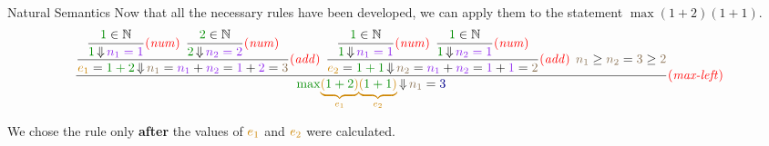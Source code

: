 \begin{example}[Lecture 3]{Natural Semantics}
  Now that all the necessary rules have been developed, we can apply them to the statement $\max (1+2) (1+1)$.
  \begin{equation*}
    \dfrac{
      \dfrac{
        \dfrac{\SemanticInput{1} \in \NaturalNumbers}{\SemanticInput{1} \EvaluatesTo \textcolor{Purple2}{n_{1} = 1}} \SemanticRuleName{num} \:\:
        \dfrac{\SemanticInput{2} \in \NaturalNumbers}{\SemanticInput{2} \EvaluatesTo \textcolor{Purple2}{n_{2} = 2}} \SemanticRuleName{num}}
      {\OrangeText{e_{1}} = \SemanticInput{1+2} \EvaluatesTo \textcolor{Burlywood4}{n_{1}} = \textcolor{Purple2}{n_{1}} + \textcolor{Purple2}{n_{2}} = \textcolor{Purple2}{1}+\textcolor{Purple2}{2}=\textcolor{Burlywood4}{3}} \SemanticRuleName{add} \:\:
      \dfrac{
        \dfrac{\SemanticInput{1} \in \NaturalNumbers}{\SemanticInput{1} \EvaluatesTo \textcolor{Purple2}{n_{1} = 1}} \SemanticRuleName{num} \:\:
        \dfrac{\SemanticInput{1} \in \NaturalNumbers}{\SemanticInput{1} \EvaluatesTo \textcolor{Purple2}{n_{2} = 1}} \SemanticRuleName{num}}
      {\OrangeText{e_{2}} = \SemanticInput{1+1} \EvaluatesTo \textcolor{Burlywood4}{n_{2}} = \textcolor{Purple2}{n_{1}} + \textcolor{Purple2}{n_{2}} = \textcolor{Purple2}{1}+\textcolor{Purple2}{1} = \textcolor{Burlywood4}{2}} \SemanticRuleName{add} \:\:
      \textcolor{Burlywood4}{n_{1}} \geq \textcolor{Burlywood4}{n_{2}} = \textcolor{Burlywood4}{3} \geq \textcolor{Burlywood4}{2}}
    {\SemanticInput{\mathtt{\max}} \OrangeText{\underbrace{(\SemanticInput{1+2}\OrangeText{)}}_{\OrangeText{e_{1}}}} \OrangeText{\underbrace{\OrangeText{(\SemanticInput{1+1}\OrangeText{)}}}_{\OrangeText{e_{2}}}} \EvaluatesTo \textcolor{Burlywood4}{n_{1}} = \textcolor{Blue4}{3}} \SemanticRuleName{max-left}
  \end{equation*}

  We chose the  rule only \textbf{after} the values of $\OrangeText{e_{1}}$ and $\OrangeText{e_{2}}$ were calculated.
\end{example}

